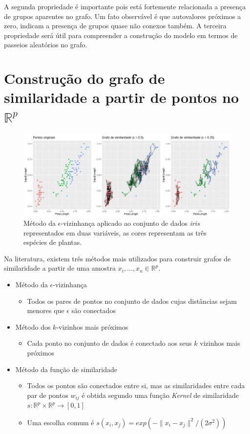 \documentclass[]{article}
\newcommand{\R}{\mathbb{R}}
\begin{document}
A segunda propriedade é importante pois está fortemente relacionada a presença de grupos aparentes no grafo. Um fato observável é que autovalores próximos a zero, indicam a presença de grupos quase não conexos também. A terceira propriedade será útil para compreender a construção do modelo em termos de passeios aleatórios no grafo.

\newpage

\section{Construção do grafo de similaridade a partir de pontos no $\R^p$}

\begin{figure}
\includegraphics[scale=0.45]{epsilon_similarity}
\caption{Método da $\epsilon$-vizinhança aplicado ao conjunto de dados \textit{iris} representados em duas variáveis, as cores representam as três espécies de plantas.}
\end{figure}

Na literatura, existem três métodos mais utilizados para construir grafos de similaridade a partir de uma amostra $x_i, ..., x_n \in \R^p$. 

\begin{itemize}
\item Método da $\epsilon$-vizinhança
\begin{itemize}
\item Todos os pares de pontos no conjunto de dados cujas distâncias sejam menores que $\epsilon$ são conectados
\end{itemize}

\item Método dos $k$-vizinhos mais próximos
\begin{itemize}
\item Cada ponto no conjunto de dados é conectado aos seus $k$ vizinhos mais próximos
\end{itemize}

\item Método da função de similaridade


\begin{itemize}
\item Todos os pontos são conectados entre si, mas as similaridades entre cada par de pontos $w_{ij}$ é obtida segundo uma função \textit{Kernel} de similaridade $s: \R^p \times \R^p \rightarrow [0,1]$
\item Uma escolha comum é $ s(x_i, x_j) = exp(-\parallel x_i - x_j\parallel^2/(2\sigma^2))$
\end{itemize}

\end{itemize}
\end{document}
